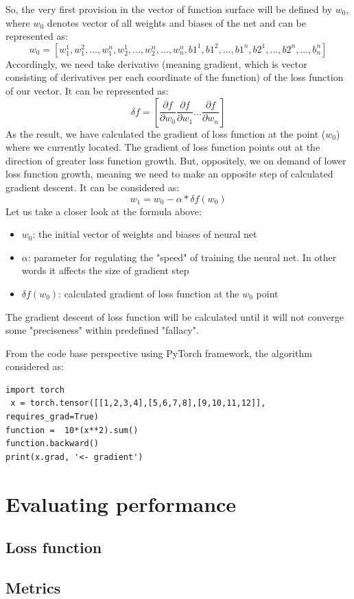 So, the very first provision in the vector of function surface will be defined by $w_0$, where $w_0$ denotes vector of all weights and biases of the net and can be represented as: 
\[ w_0 = [w_1^1, w_1^2,...,w_1^n, w_2^1,...,w_2^n,...,w_n^n, b1^1, b1^2,...,b1^n, b2^1,...,b2^n,...,b_n^n] \]
Accordingly, we need take derivative (meaning gradient, which is vector consisting of derivatives per each coordinate of the function) of the loss function of our vector. It can be represented as:
\[ \delta{f} = [\frac{\partial{f}}{\partial{w_0}} \frac{\partial{f}}{\partial{w_1}} ... \frac{\partial{f}}{\partial{w_n}} ] \]
As the result, we have calculated the gradient of loss function at the point ($w_0$) where we currently located. The gradient of loss function points out at the direction of greater loss function growth. But, oppositely, we on demand of lower loss function growth, meaning we need to make an opposite step of calculated gradient descent. It can be considered as:
\[ w_1 = w_0 - \alpha*\delta{f(w_0)} \]
Let us take a closer look at the formula above:
\begin{itemize}
    \item $w_0$: the initial vector of weights and biases of neural net
    \item $\alpha$: parameter for regulating the "speed" of training the neural net. In other words it affects the size of gradient step 
    \item $\delta{f(w_0)}$: calculated gradient of loss function at the $w_0$ point 
\end{itemize}
The gradient descent of loss function will be calculated until it will not converge some "preciseness" within predefined "fallacy".


From the code base perspective using PyTorch framework, the algorithm considered as:
\begin{lstlisting}
import torch
 x = torch.tensor([[1,2,3,4],[5,6,7,8],[9,10,11,12]],                requires_grad=True) 
function =  10*(x**2).sum()
function.backward()
print(x.grad, '<- gradient')
\end{lstlisting}

\section{Evaluating performance}
\subsection{Loss function}
\subsection{Metrics}


